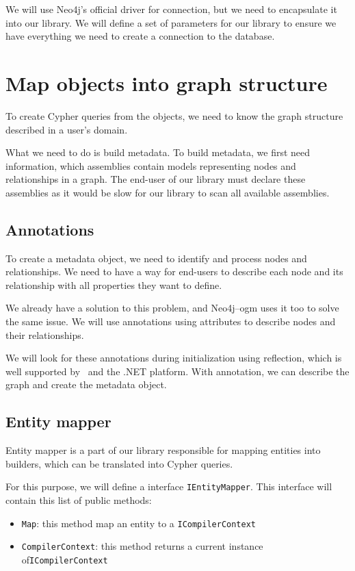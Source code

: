 We will use Neo4j's official driver for connection, but we need to encapsulate it into our library.
We will define a set of parameters for our library to ensure we have everything we need to create a connection to the database.

\section {Map objects into graph structure}

To create Cypher queries from the objects, we need to know the graph structure described in a user's domain.

What we need to do is build metadata.
To build metadata, we first need information, which assemblies contain models representing nodes and relationships in a graph.
The end-user of our library must declare these assemblies as it would be slow for our library to scan all available assemblies.

\subsection {Annotations}

To create a metadata object, we need to identify and process nodes and relationships.
We need to have a way for end-users to describe each node and its relationship with all properties they want to define.

We already have a solution to this problem, and Neo4j--\acrshort{ogm} uses it too to solve the same issue.
We will use annotations using attributes to describe nodes and their relationships.

We will look for these annotations during initialization using reflection, which is well supported by \CS\ and the .NET platform.
With annotation, we can describe the graph and create the metadata object.

\subsection {Entity mapper}

Entity mapper is a part of our library responsible for mapping entities into builders, which can be translated into Cypher queries.

For this purpose, we will define a interface \texttt{IEntityMapper}. This interface will contain
this list of public methods:

\begin{itemize}
	\item {\texttt{Map}: this method map an entity to a \texttt{ICompilerContext}}
	\item {\texttt{CompilerContext}: this method returns a current instance of\linebreak \texttt{ICompilerContext}}
\end{itemize}

